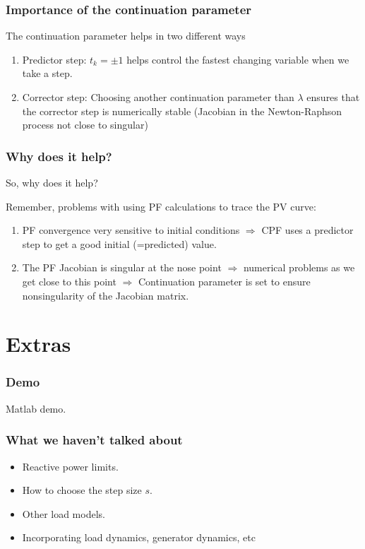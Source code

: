 \documentclass{beamer}
\begin{document}
\begin{frame}
  \frametitle{Importance of the continuation parameter}
  The continuation parameter helps in two different ways
  \begin{enumerate}
  \item Predictor step: $t_k = \pm 1$ helps control the fastest changing variable when we take a step.
  \item Corrector step: Choosing another continuation parameter than $\lambda$ ensures that the corrector step is numerically stable (Jacobian in the Newton-Raphson process not close to singular)
  \end{enumerate}
\end{frame}

\begin{frame}
\frametitle{Why does it help?}
So, why does it help?

Remember, problems with using PF calculations to trace the PV curve:
\begin{enumerate}
\item PF convergence very sensitive to initial conditions $\Rightarrow$ CPF uses a predictor step to get a good initial (=predicted) value.
\item The PF Jacobian is singular at the nose point $\Rightarrow$ numerical problems as we get close to this point $\Rightarrow$ Continuation parameter is set to ensure nonsingularity of the Jacobian matrix.
\end{enumerate}
\end{frame}

\section{Extras}

\begin{frame}
  \frametitle{Demo}
  Matlab demo.
\end{frame}

\begin{frame}
  \frametitle{What we haven't talked about}
  \begin{itemize}
  \item Reactive power limits.
  \item How to choose the step size $s$.
  \item Other load models.
  \item Incorporating load dynamics, generator dynamics, etc
  \end{itemize}
\end{frame}
\end{document}
